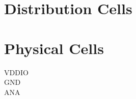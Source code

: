 \documentclass[10pt,a4paper,twoside]{article}
\begin{document}



















\section{Distribution Cells}





\section{Physical Cells}





VDDIO \\
GND \\
ANA
\end{document}
